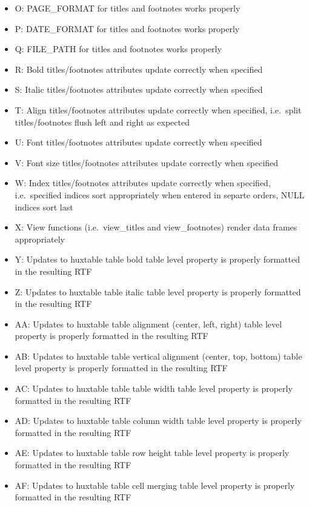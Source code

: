 \documentclass[]{article}
\begin{document}
\begin{itemize}
\item
  O: PAGE\_FORMAT for titles and footnotes works properly
\item
  P: DATE\_FORMAT for titles and footnotes works properly
\item
  Q: FILE\_PATH for titles and footnotes works properly
\item
  R: Bold titles/footnotes attributes update correctly when specified
\item
  S: Italic titles/footnotes attributes update correctly when specified
\item
  T: Align titles/footnotes attributes update correctly when specified,
  i.e.~split titles/footnotes flush left and right as expected
\item
  U: Font titles/footnotes attributes update correctly when specified
\item
  V: Font size titles/footnotes attributes update correctly when
  specified
\item
  W: Index titles/footnotes attributes update correctly when specified,
  i.e.~specified indices sort appropriately when entered in separte
  orders, NULL indices sort last
\item
  X: View functions (i.e.~view\_titles and view\_footnotes) render data
  frames appropriately
\item
  Y: Updates to huxtable table bold table level property is properly
  formatted in the resulting RTF
\item
  Z: Updates to huxtable table italic table level property is properly
  formatted in the resulting RTF
\item
  AA: Updates to huxtable table alignment (center, left, right) table
  level property is properly formatted in the resulting RTF
\item
  AB: Updates to huxtable table vertical alignment (center, top, bottom)
  table level property is properly formatted in the resulting RTF
\item
  AC: Updates to huxtable table table width table level property is
  properly formatted in the resulting RTF
\item
  AD: Updates to huxtable table column width table level property is
  properly formatted in the resulting RTF
\item
  AE: Updates to huxtable table row height table level property is
  properly formatted in the resulting RTF
\item
  AF: Updates to huxtable table cell merging table level property is
  properly formatted in the resulting RTF
\end{itemize}
\end{document}
